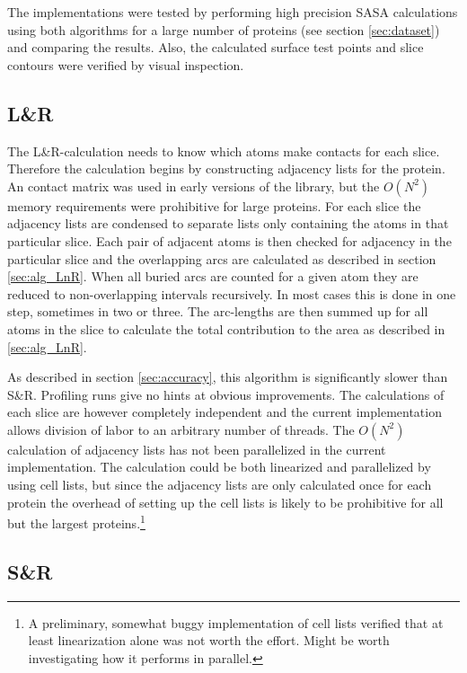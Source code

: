 \documentclass[a4paper,11pt]{article}
\begin{document}
The implementations were tested by performing high precision SASA
calculations using both algorithms for a large number of proteins (see
section \ref{sec:dataset}) and comparing the results. Also, the
calculated surface test points and slice contours were verified by
visual inspection.

\subsection{L\&R}

The L\&R-calculation needs to know which atoms make contacts for each
slice. Therefore the calculation begins by constructing adjacency
lists for the protein. An contact matrix was used in early versions of
the library, but the $O(N^2)$ memory requirements were prohibitive for
large proteins. For each slice the adjacency lists are condensed to
separate lists only containing the atoms in that particular
slice. Each pair of adjacent atoms is then checked for adjacency in
the particular slice and the overlapping arcs are calculated as
described in section \ref{sec:alg_LnR}. When all buried arcs are
counted for a given atom they are reduced to non-overlapping intervals
recursively. In most cases this is done in one step, sometimes in two
or three. The arc-lengths are then summed up for all atoms in the
slice to calculate the total contribution to the area as described in
\ref{sec:alg_LnR}.

As described in section \ref{sec:accuracy}, this algorithm is
significantly slower than S\&R. Profiling runs give no hints at
obvious improvements. The calculations of each slice are however
completely independent and the current implementation allows division
of labor to an arbitrary number of threads. The $O(N^2)$ calculation
of adjacency lists has not been parallelized in the current
implementation. The calculation could be both linearized and
parallelized by using cell lists, but since the adjacency lists are
only calculated once for each protein the overhead of setting up the
cell lists is likely to be prohibitive for all but the largest
proteins.\footnote{A preliminary, somewhat buggy implementation of
  cell lists verified that at least linearization alone was not worth
  the effort. Might be worth investigating how it performs in
  parallel.}


\subsection{S\&R}
\end{document}
